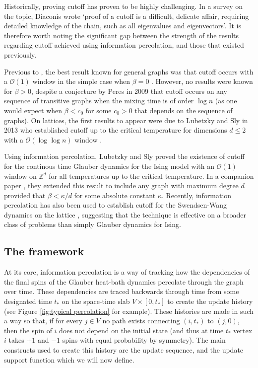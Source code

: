 	Historically, proving cutoff has proven to be highly challenging. In a survey on the topic, Diaconis \cite{Diaconis1996-sz} wrote `proof of a cutoff is a difficult, delicate affair, requiring detailed knowledge of the chain, such as all eigenvalues and eigenvectors'. It is therefore worth noting the significant gap between the strength of the results regarding cutoff achieved using information percolation, and those that existed previously.

	Previous to \cite{Lubetzky2016-wd}, the best result known for general graphs was that cutoff occurs with a $\mathcal{O}(1)$ window in the simple case when $\beta = 0$ \cite{Aldous1983-gz}. However, no results were known for $\beta > 0$, despite a conjecture by Peres in 2009 \cite[Section 23.2]{Levin2009-fo} that cutoff occurs on any sequence of transitive graphs when the mixing time is of order $\log n$ (as one would expect when $\beta < c_0$ for some $c_0 > 0$ that depends on the sequence of graphs). On lattices, the first results to appear were due to Lubetzky and Sly in 2013 who established cutoff up to the critical temperature for dimensions $d \leq 2$ with a $\mathcal{O}(\log \log n)$ window \cite{Lubetzky2013-yv}. 

	Using information percolation, Lubetzky and Sly proved the existence of cutoff for the continous time Glauber dynamics for the Ising model with an $\mathcal{O}(1)$ window on $\mathbb{Z}^d$ for all temperatures up to the critical temperature. In a companion paper \cite{Lubetzky2017-nc}, they extended this result to include any graph with maximum degree $d$ provided that $\beta < \kappa/d$ for some absolute constant $\kappa$. Recently, information percolation has also been used to establish cutoff for the Swendsen-Wang dynamics on the lattice \cite{Nam2018-io}, suggesting that the technique is effective on a broader class of problems than simply Glauber dynamics for Ising.
	
	\subsection{The framework}
	At its core, information percolation is a way of tracking how the dependencies of the final spins of the Glauber heat-bath dynamics percolate through the graph over time. These dependencies are traced backwards through time from some designated time $t_*$ on the space-time slab $V \times [0, t_*]$ to create the update history (see Figure \ref{fig:typical percolation} for example). These histories are made in such a way so that, if for every $j \in V$ no path exists connecting $(i, t_*)$ to $(j, 0)$, then the spin of $i$ does not depend on the initial state (and thus at time $t_*$ vertex $i$ takes $+1$ and $-1$ spins with equal probability by symmetry). The main constructs used to create this history are the update sequence, and the update support function which we will now define.

